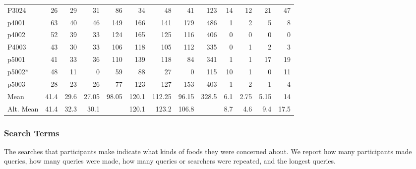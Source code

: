 \begin{table}[htbp]
\begin{tabular}{lrrrrrrrrrrrr}
    P3024 & 26    & 29    & 31    & 86    & 34    & 48    & 41    & 123   & 14    & 12    & 21    & 47 \\
    p4001 & 63    & 40    & 46    & 149   & 166   & 141   & 179   & 486   & 1     & 2     & 5     & 8 \\
    p4002 & 52    & 39    & 33    & 124   & 165   & 125   & 116   & 406   & 0     & 0     & 0     & 0 \\
    P4003 & 43    & 30    & 33    & 106   & 118   & 105   & 112   & 335   & 0     & 1     & 2     & 3 \\
    p5001 & 41    & 33    & 36    & 110   & 139   & 118   & 84    & 341   & 1     & 1     & 17    & 19 \\
    p5002* & 48    & 11    & 0     & 59    & 88    & 27    & 0     & 115   & 10    & 1     & 0     & 11 \\
    p5003 & 28    & 23    & 26    & 77    & 123   & 127   & 153   & 403   & 1     & 2     & 1     & 4 \\
\midrule
    Mean  & 41.4  & 29.6  & 27.05 & 98.05 & 120.1 & 112.25 & 96.15 & 328.5 & 6.1   & 2.75  & 5.15  & 14 \\
    Alt. Mean & 41.4  & 32.3  & 30.1  &       & 120.1 & 123.2 & 106.8 &       & 8.7   & 4.6   & 9.4   & 17.5 \\

    \bottomrule
    \end{tabular}%
  \label{tab:strategy_table}%
\end{table}%


\subsubsection{Search Terms}
The searches that participants make indicate what kinds of foods they were concerned about. We report how many participants made queries, how many queries were made, how many queries or searchers were repeated, and the longest queries. 

